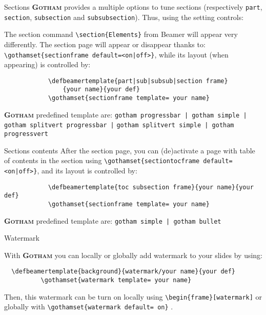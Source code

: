 \documentclass[aspectratio=169]{beamer}
\newcommand{\themename}{\textbf{\textsc{Gotham}}}
\begin{document}
	\begin{frame}[fragile]{Sections}
		\themename{} provides a multiple options to tune sections (respectively \verb|part|, \verb|section|, \verb|subsection| and \verb|subsubsection|).
		Thus, using the setting controls:
		
		The section command \verb|\section{Elements}| from Beamer will appear very differently.
		The section page will appear or disappear thanks to: \verb$\gothamset{sectionframe default=<on|off>}$, while its layout (when appearing) is controlled by: 
		\begin{verbatim}
			\defbeamertemplate{part|sub|subsub|section frame}
				{your name}{your def}
			\gothamset{sectionframe template= your name}\end{verbatim}

		\themename{} predefined template are: \verb$gotham progressbar | gotham simple |$ \verb$gotham splitvert progressbar |$ \verb$gotham splitvert simple | gotham progressvert$
	\end{frame}

	\begin{frame}[fragile]{Sections contents}
		After the section page, you can (de)activate a page with table of contents in the section using \verb$\gothamset{sectiontocframe default=<on|off>}$, and its layout is controlled by: 
		\begin{verbatim}
			\defbeamertemplate{toc subsection frame}{your name}{your def}
			\gothamset{sectionframe template= your name}
		\end{verbatim}

		\themename{} predefined template are: \verb$gotham simple | gotham bullet$
	\end{frame}

	\begin{frame}{Watermark}

		With \themename{} you can locally or globally add watermark to your slides by using:
		\begin{verbatim}  \defbeamertemplate{background}{watermark/your name}{your def}
		  \gothamset{watermark template= your name}\end{verbatim}
		
		Then, this watermark can be turn on locally using \verb|\begin{frame}[watermark]| or globally with \verb|\gothamset{watermark default= on}| .
 	\end{frame}
\end{document}
